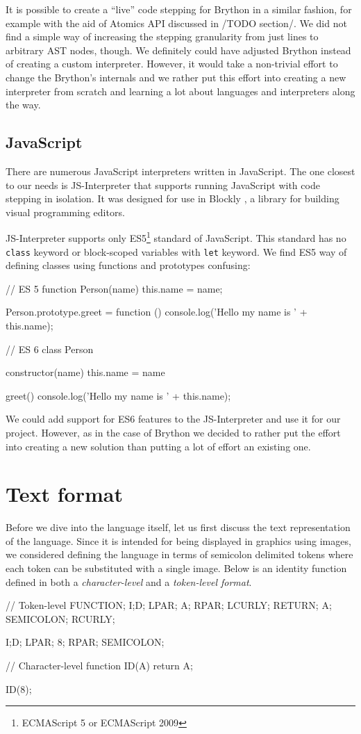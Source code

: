 It is possible to create a ``live'' code stepping for Brython in a similar fashion, for example with the aid of Atomics API discussed in /TODO section/.
We did not find a simple way of increasing the stepping granularity from just lines to arbitrary AST nodes, though. We definitely could have adjusted Brython instead
of creating a custom interpreter. However, it would take a non-trivial effort to change the Brython's internals and we rather put this effort into creating
a new interpreter from scratch and learning a lot about languages and interpreters along the way.

\subsection{JavaScript}
There are numerous JavaScript interpreters written in JavaScript. The one closest to our needs is JS-Interpreter \cite{JSInterpreter} that supports running JavaScript
with code stepping in isolation. It was designed for use in Blockly \cite{Blockly}, a library for building visual programming editors.

JS-Interpreter supports only ES5\footnote{ECMAScript 5 or ECMAScript 2009} standard of JavaScript. This standard has no \texttt{class} keyword or block-scoped
variables with \texttt{let} keyword. We find ES5 way of defining classes using functions and prototypes confusing:
\begin{code}
// ES 5
function Person(name) {
    this.name = name;  
}

Person.prototype.greet = function () {
    console.log('Hello my name is ' + this.name);
}

// ES 6
class Person {
    constructor(name) {
        this.name = name
    }

    greet() {
        console.log('Hello my name is ' + this.name);
    }
}
\end{code}

We could add support for ES6 features to the JS-Interpreter and use it for our project. However, as in the case of Brython we decided to rather put the effort into
creating a new solution than putting a lot of effort an existing one.

\section{Text format}
Before we dive into the language itself, let us first discuss the text representation of the language. Since it is intended for being displayed in
graphics using images, we considered defining the language in terms of semicolon delimited tokens where each token can be substituted with a single image.
Below is an identity function defined in both a \emph{character-level} and a \emph{token-level format}.
\begin{code}
// Token-level
FUNCTION; I;D; LPAR; A; RPAR; LCURLY;
RETURN; A; SEMICOLON;
RCURLY;

I;D; LPAR; 8; RPAR; SEMICOLON;

// Character-level
function ID(A) {
    return A;
}

ID(8);
\end{code}

